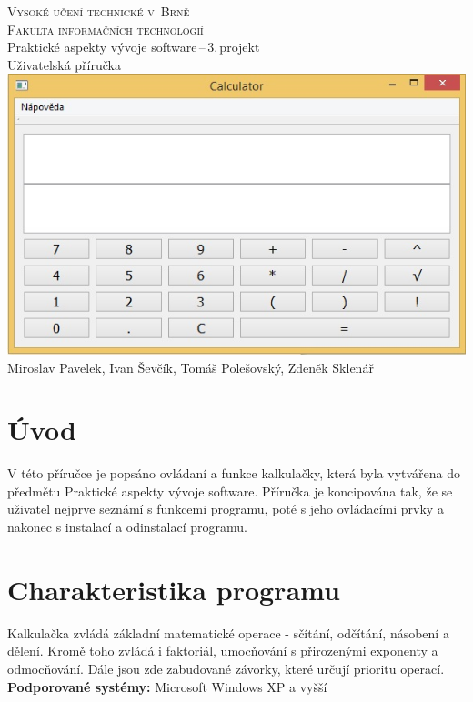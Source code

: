 \documentclass[11pt,a4paper,titlepage]{article}
\begin{document}
\begin{titlepage}
\begin{center}
{\Huge\textsc{Vysoké učení technické v~Brně}}\\
\medskip
{\huge\textsc{Fakulta informačních technologií}}\\
{\LARGE Praktické aspekty vývoje software\,--\,3.\,projekt}\\
\medskip
{\Huge Uživatelská příručka}\\ 
\includegraphics[keepaspectratio=true,scale=0.6]{mainPicture} \\
{\Large Miroslav Pavelek, Ivan Ševčík, Tomáš Polešovský, Zdeněk Sklenář}
\end{center}
\end{titlepage}
\tableofcontents
\pagebreak

\section{Úvod}
V této příručce je popsáno ovládaní a funkce kalkulačky, která byla vytvářena do předmětu Praktické aspekty vývoje software. Příručka je koncipována tak, že se uživatel nejprve seznámí s funkcemi programu, poté s jeho ovládacími prvky a nakonec s instalací a odinstalací programu.
\section{Charakteristika programu}
Kalkulačka zvládá základní matematické operace - sčítání, odčítání, násobení a dělení. Kromě toho zvládá i faktoriál, umocňování s přirozenými exponenty a odmocňování. Dále jsou zde zabudované závorky, které určují prioritu operací.\\
\textbf{Podporované systémy:} Microsoft Windows XP a vyšší
\end{document}
